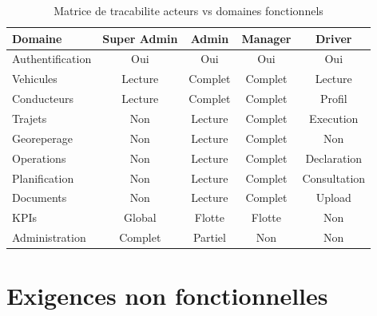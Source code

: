 \documentclass[12pt,a4paper]{report}
\begin{document}
\begin{table}[H]
\caption{Matrice de tracabilite acteurs vs domaines fonctionnels}
\label{tab:matrice_acteurs}
\centering\small
\begin{tabularx}{\textwidth}{Xcccc}
\toprule
\textbf{Domaine} & \textbf{Super Admin} & \textbf{Admin} & \textbf{Manager} & \textbf{Driver} \\
\midrule
Authentification & \cellcolor{fleetsuccess!20}Oui & \cellcolor{fleetsuccess!20}Oui & \cellcolor{fleetsuccess!20}Oui & \cellcolor{fleetsuccess!20}Oui \\
Vehicules        & \cellcolor{fleetwarning!20}Lecture & \cellcolor{fleetsuccess!20}Complet & \cellcolor{fleetsuccess!20}Complet & \cellcolor{fleetwarning!20}Lecture \\
Conducteurs      & \cellcolor{fleetwarning!20}Lecture & \cellcolor{fleetsuccess!20}Complet & \cellcolor{fleetsuccess!20}Complet & \cellcolor{fleetwarning!20}Profil \\
Trajets          & \cellcolor{fleeterror!20}Non & \cellcolor{fleetwarning!20}Lecture & \cellcolor{fleetsuccess!20}Complet & \cellcolor{fleetsuccess!20}Execution \\
Georeperage      & \cellcolor{fleeterror!20}Non & \cellcolor{fleetwarning!20}Lecture & \cellcolor{fleetsuccess!20}Complet & \cellcolor{fleeterror!20}Non \\
Operations       & \cellcolor{fleeterror!20}Non & \cellcolor{fleetwarning!20}Lecture & \cellcolor{fleetsuccess!20}Complet & \cellcolor{fleetsuccess!20}Declaration \\
Planification    & \cellcolor{fleeterror!20}Non & \cellcolor{fleetwarning!20}Lecture & \cellcolor{fleetsuccess!20}Complet & \cellcolor{fleetwarning!20}Consultation \\
Documents        & \cellcolor{fleeterror!20}Non & \cellcolor{fleetwarning!20}Lecture & \cellcolor{fleetsuccess!20}Complet & \cellcolor{fleetwarning!20}Upload \\
KPIs             & \cellcolor{fleetsuccess!20}Global & \cellcolor{fleetsuccess!20}Flotte & \cellcolor{fleetsuccess!20}Flotte & \cellcolor{fleeterror!20}Non \\
Administration   & \cellcolor{fleetsuccess!20}Complet & \cellcolor{fleetwarning!20}Partiel & \cellcolor{fleeterror!20}Non & \cellcolor{fleeterror!20}Non \\
\bottomrule
\end{tabularx}
\end{table}

\section{Exigences non fonctionnelles}
\end{document}

